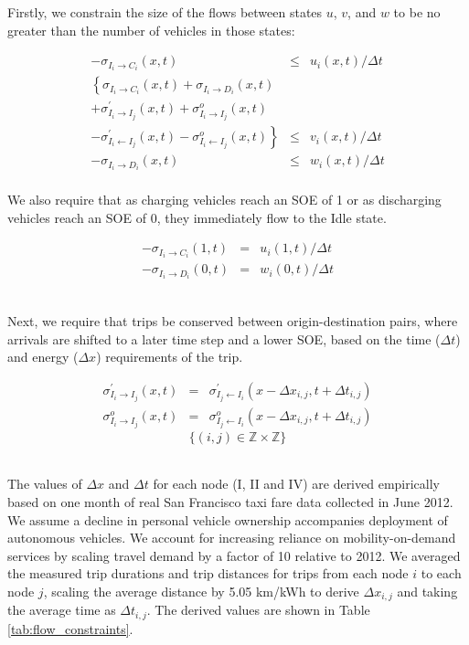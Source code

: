 \documentclass[journal]{IEEEtran}
\begin{document}
Firstly, we constrain the size of the flows between states $u$, $v$, and $w$ to be no greater than the number of vehicles in those states:

\begin{eqnarray*}
    -\sigma_{I_i \rightarrow C_i}(x,t) & \le & u_i(x,t) / \Delta t \\
  \left\{ \sigma_{I_i \rightarrow C_i}(x,t) + \sigma_{I_i \rightarrow D_i}(x,t) \right. && \\
  + \sigma_{I_i \rightarrow I_j}^\prime(x,t) + \sigma_{I_i \rightarrow I_j}^o(x,t) && \\
  \left. - \sigma_{I_i \leftarrow I_j}^\prime(x,t) - \sigma_{I_i \leftarrow I_j}^o(x,t) \right\} & \le & v_i(x,t) / \Delta t \\
    -\sigma_{I_i \rightarrow D_i}(x,t) & \le & w_i(x,t) / \Delta t
\end{eqnarray*}
~\\ 
We also require that as charging vehicles reach an SOE of 1 or as discharging vehicles reach an SOE of 0, they immediately flow to the Idle state.

\begin{eqnarray*}
    -\sigma_{I_i \rightarrow C_i}(1,t) & = & u_i(1,t) / \Delta t \\
    -\sigma_{I_i \rightarrow D_i}(0,t) & = & w_i(0,t) / \Delta t
\end{eqnarray*}

~\\ 
Next, we require that trips be conserved between origin-destination pairs, where arrivals are shifted to a later time step and a lower SOE, based on the time ($\Delta t$) and energy ($\Delta x$) requirements of the trip.

\begin{eqnarray*}
    \sigma_{I_i \rightarrow I_j}^\prime(x,t) & = & \sigma_{I_j \leftarrow I_i}^\prime(x - \Delta x_{i,j},t + \Delta t_{i,j}) \\
     \sigma_{I_i \rightarrow I_j}^o(x,t) & = & \sigma_{I_j \leftarrow I_i}^o(x - \Delta x_{i,j},t + \Delta t_{i,j})
\end{eqnarray*}
\begin{equation*}
\{(i,j) \in \mathbb{Z} \times \mathbb{Z}\} 
\end{equation*}

~\\ 
The values of $\Delta x$ and $\Delta t$ for each node (I, II and IV) are derived empirically based on one month of real San Francisco taxi fare data collected in June 2012. We assume a decline in personal vehicle ownership accompanies deployment of autonomous vehicles. We account for increasing reliance on mobility-on-demand services by scaling travel demand by a factor of 10 relative to 2012. We averaged the measured trip durations and trip distances for trips from each node $i$ to each node $j$, scaling the average distance by 5.05 km/kWh to derive $\Delta x_{i,j}$ and taking the average time as $\Delta t_{i,j}$. The derived values are shown in Table \ref{tab:flow_constraints}.
\end{document}
